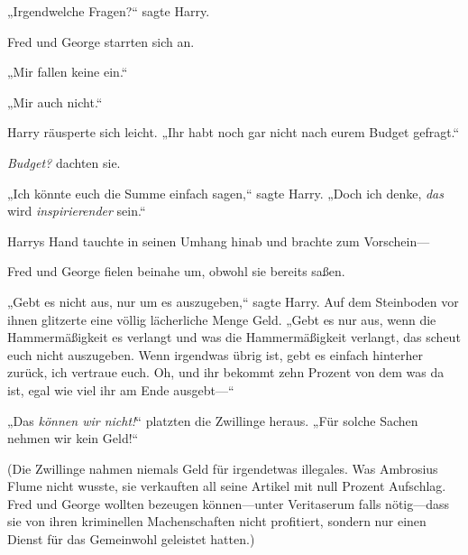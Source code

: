 „Irgendwelche Fragen?“ sagte Harry.

Fred und George starrten sich an.

„Mir fallen keine ein.“

„Mir auch nicht.“

Harry räusperte sich leicht. „Ihr habt noch gar nicht nach eurem Budget gefragt.“

\emph{Budget?} dachten sie.

„Ich könnte euch die Summe einfach sagen,“ sagte Harry. „Doch ich denke, \emph{das} wird \emph{inspirierender} sein.“

Harrys Hand tauchte in seinen Umhang hinab und brachte zum Vorschein—

Fred und George fielen beinahe um, obwohl sie bereits saßen.

„Gebt es nicht aus, nur um es auszugeben,“ sagte Harry. Auf dem Steinboden vor ihnen glitzerte eine völlig lächerliche Menge Geld. „Gebt es nur aus, wenn die Hammermäßigkeit es verlangt und was die Hammermäßigkeit verlangt, das scheut euch nicht auszugeben. Wenn irgendwas übrig ist, gebt es einfach hinterher zurück, ich vertraue euch. Oh, und ihr bekommt zehn Prozent von dem was da ist, egal wie viel ihr am Ende ausgebt—“

„Das \emph{können wir nicht!}“ platzten die Zwillinge heraus. „Für solche Sachen nehmen wir kein Geld!“

(Die Zwillinge nahmen niemals Geld für irgendetwas illegales. Was Ambrosius Flume nicht wusste, sie verkauften all seine Artikel mit null Prozent Aufschlag. Fred und George wollten bezeugen können—unter Veritaserum falls nötig—dass sie von ihren kriminellen Machenschaften nicht profitiert, sondern nur einen Dienst für das Gemeinwohl geleistet hatten.)

